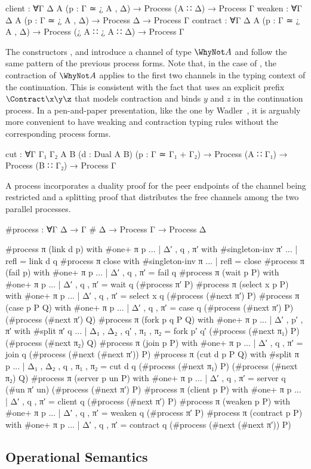 \begin{AgdaAlign}
\begin{code}
   client    : ∀{Γ Δ A} (p : Γ ≃ ¿ A , Δ) → Process (A ∷ Δ) → Process Γ
   weaken    : ∀{Γ Δ A} (p : Γ ≃ ¿ A , Δ) → Process Δ → Process Γ
   contract  : ∀{Γ Δ A} (p : Γ ≃ ¿ A , Δ) → Process (¿ A ∷ ¿ A ∷ Δ) → Process Γ
\end{code}

The constructors ,
 and 
introduce a channel of type $\WhyNot A$ and follow the same pattern of the
previous process forms. Note that, in the case of
, the contraction of $\WhyNot A$ applies to
the first two channels in the typing context of the continuation. This is
consistent with the fact that \Calculus uses an explicit prefix
$\Contract\x\y\z$ that models contraction and binds $y$ and $z$ in the
continuation process. In a pen-and-paper presentation, like the one by
Wadler~\citep{Wadler14}, it is arguably more convenient to have weaking and
contraction typing rules without the corresponding process forms.

\begin{code}
   cut       : ∀{Γ Γ₁ Γ₂ A B} (d : Dual A B) (p : Γ ≃ Γ₁ + Γ₂) →
               Process (A ∷ Γ₁) → Process (B ∷ Γ₂) → Process Γ
\end{code}

A  process incorporates a duality proof for the
peer endpoints of the channel being restricted and a splitting proof that
distributes the free channels among the two parallel processes.

\end{AgdaAlign}

\begin{code}
#process : ∀{Γ Δ} → Γ # Δ → Process Γ → Process Δ
\end{code}
\begin{code}[hide]
#process π (link d p) with #one+ π p
... | Δ′ , q , π′ with #singleton-inv π′
... | refl = link d q
#process π close with #singleton-inv π
... | refl = close
#process π (fail p) with #one+ π p
... | Δ′ , q , π′ = fail q
#process π (wait p P) with #one+ π p
... | Δ′ , q , π′ = wait q (#process π′ P)
#process π (select x p P) with #one+ π p
... | Δ′ , q , π′ = select x q (#process (#next π′) P)
#process π (case p P Q) with #one+ π p
... | Δ′ , q , π′ = case q (#process (#next π′) P) (#process (#next π′) Q)
#process π (fork p q P Q) with #one+ π p
... | Δ′ , p′ , π′ with #split π′ q
... | Δ₁ , Δ₂ , q′ , π₁ , π₂ = fork p′ q′ (#process (#next π₁) P) (#process (#next π₂) Q)
#process π (join p P) with #one+ π p
... | Δ′ , q , π′ = join q (#process (#next (#next π′)) P)
#process π (cut d p P Q) with #split π p
... | Δ₁ , Δ₂ , q , π₁ , π₂ = cut d q (#process (#next π₁) P) (#process (#next π₂) Q)
#process π (server p un P) with #one+ π p
... | Δ′ , q , π′ = server q (#un π′ un) (#process (#next π′) P)
#process π (client p P) with #one+ π p
... | Δ′ , q , π′ = client q (#process (#next π′) P)
#process π (weaken p P) with #one+ π p
... | Δ′ , q , π′ = weaken q (#process π′ P)
#process π (contract p P) with #one+ π p
... | Δ′ , q , π′ = contract q (#process (#next (#next π′)) P)
\end{code}

\subsection{Operational Semantics}
\label{sec:semantics-agda}

